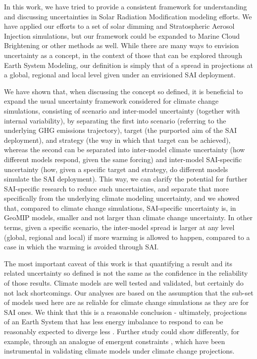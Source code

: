 \documentclass[acp, manuscript]{copernicus}
\begin{document}
\conclusions  %

In this work, we have tried to provide a consistent framework for understanding and discussing uncertainties in Solar Radiation Modification modeling efforts. We have applied our efforts to a set of solar dimming and Stratospheric Aerosol Injection simulations, but our framework could be expanded to Marine Cloud Brightening or other methods as well. While there are many ways to envision uncertainty as a concept, in the context of those that can be explored through Earth System Modeling, our definition is simply that of a spread in projections at a global, regional and local level given under an envisioned SAI deployment.

We have shown that, when discussing the concept so defined, it is beneficial to expand the usual uncertainty framework considered for climate change simulations, consisting of scenario and inter-model uncertainty (together with internal variability), by separating the first into scenario (referring to the underlying GHG emissions trajectory), target (the purported aim of the SAI deployment), and strategy (the way in which that target can be achieved), whereas the second can be separated into inter-model climate uncertainty (how different models respond, given the same forcing) and inter-model SAI-specific uncertainty (how, given a specific target and strategy, do different models simulate the SAI deployment). This way, we can clarify the potential for further SAI-specific research to reduce such uncertainties, and separate that more specifically from the underlying climate modeling uncertainty, and we showed that, compared to climate change simulations, SAI-specific uncertainty is, in GeoMIP models, smaller and not larger than climate change uncertainty. In other terms, given a specific scenario, the inter-model spread is larger at any level (global, regional and local) if more warming is allowed to happen, compared to a case in which the warming is avoided through SAI.

The most important caveat of this work is that quantifying a result and its related uncertainty so defined is not the same as the confidence in the reliability of those results. Climate models are well tested and validated, but certainly do not lack shortcomings. Our analyses are based on the assumption that the sub-set of models used here are as reliable for climate change simulations as they are for SAI ones. We think that this is a reasonable conclusion - ultimately, projections of an Earth System that has less energy imbalance to respond to can be reasonably expected to diverge less \citep{MarMartin2015}.  Further study could show differently, for example, through an analogue of emergent constraints \citep[e.g.,][]{Hall2019}, which have been instrumental in validating climate models under climate change projections.
\end{document}
